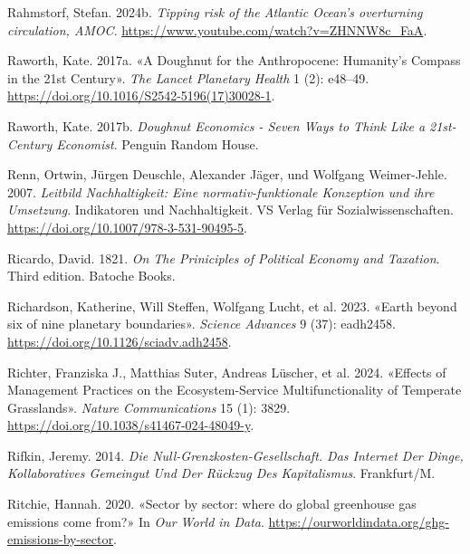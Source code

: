 \documentclass[
  nswissgerman,
  a4paper,
  DIV=11,
  numbers=noendperiod,
  oneside,
  openany]{scrreprt}
\newlength{\cslhangindent}
\newenvironment{CSLReferences}[2] %
 {\begin{list}{}{%
  \setlength{\itemindent}{0pt}
  \setlength{\leftmargin}{0pt}
  \setlength{\parsep}{0pt}
  \ifodd #1
   \setlength{\leftmargin}{\cslhangindent}
   \setlength{\itemindent}{-1\cslhangindent}
  \fi
  \setlength{\itemsep}{#2\baselineskip}}}
 {\end{list}}
\begin{document}
\begin{CSLReferences}{1}{1}
Rahmstorf, Stefan. 2024b. \emph{Tipping risk of the {Atlantic} {Ocean}'s
overturning circulation, AMOC}.
\url{https://www.youtube.com/watch?v=ZHNNW8c_FaA}.

Raworth, Kate. 2017a. {«A {Doughnut} for the {Anthropocene}: Humanity's
Compass in the 21st Century»}. \emph{The Lancet Planetary Health} 1 (2):
e48--49. \url{https://doi.org/10.1016/S2542-5196(17)30028-1}.

Raworth, Kate. 2017b. \emph{Doughnut {Economics} - {Seven Ways} to
{Think Like} a 21st-{Century Economist}}. Penguin Random House.

Renn, Ortwin, Jürgen Deuschle, Alexander Jäger, und Wolfgang
Weimer-Jehle. 2007. \emph{{Leitbild Nachhaltigkeit: Eine
normativ-funktionale Konzeption und ihre Umsetzung}}. {Indikatoren und
Nachhaltigkeit}. VS Verlag f{ü}r Sozialwissenschaften.
\url{https://doi.org/10.1007/978-3-531-90495-5}.

Ricardo, David. 1821. \emph{On {The Priniciples} of {Political Economy}
and {Taxation}}. Third edition. Batoche Books.

Richardson, Katherine, Will Steffen, Wolfgang Lucht, et al. 2023.
{«Earth beyond six of nine planetary boundaries»}. \emph{Science
Advances} 9 (37): eadh2458.
\url{https://doi.org/10.1126/sciadv.adh2458}.

Richter, Franziska J., Matthias Suter, Andreas Lüscher, et al. 2024.
{«Effects of Management Practices on the Ecosystem-Service
Multifunctionality of Temperate Grasslands»}. \emph{Nature
Communications} 15 (1): 3829.
\url{https://doi.org/10.1038/s41467-024-48049-y}.

Rifkin, Jeremy. 2014. \emph{Die {Null-Grenzkosten-Gesellschaft}. {Das
Internet} Der {Dinge}, Kollaboratives {Gemeingut} Und Der {R{ü}ckzug}
Des {Kapitalismus}}. Frankfurt/M.

Ritchie, Hannah. 2020. {«Sector by sector: where do global greenhouse
gas emissions come from?»} In \emph{Our World in Data}.
\url{https://ourworldindata.org/ghg-emissions-by-sector}.


\end{CSLReferences}
\end{document}
